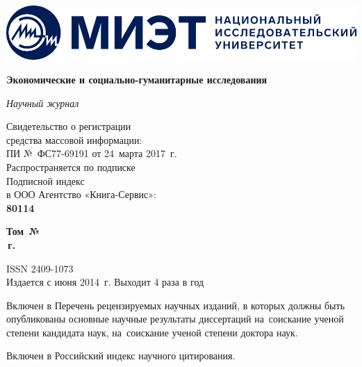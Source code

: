 
\pagestyle{empty}
\begin{center}
  \includegraphics[width=\textwidth]{logo}
\vspace*{5mm}
{\fontsize{16pt}{20pt}\selectfont\bfseries Экономические и социально-гуманитарные исследования \par}

{\itshape Научный журнал}
\end{center}

\noindent
\begin{minipage}{.5\textwidth}
  \small
Свидетельство о регистрации\\
средства массовой информации:\\
ПИ № ФС77-69191 от 24 марта 2017 г.\\
Распространяется по подписке\\
Подписной индекс\\
в ООО Агентство «Книга-Сервис»:\\
\textbf{80114}
\end{minipage}%
\begin{minipage}{.5\textwidth}
\begin{flushright}
  {\fontsize{16pt}{20pt}\selectfont\bfseries Том\,\esgiVol{} №\,\esgiNum{}\\
  \esgiYear\,г.\par}

  \vspace{5mm}
  \small
  ISSN 2409-1073\\
  Издается с июня 2014 г. Выходит 4 раза в год
\end{flushright}
\end{minipage}

\begin{flushleft}
  \small
  Включен в Перечень рецензируемых научных изданий, в которых должны быть опубликованы
основные научные результаты диссертаций на соискание ученой степени кандидата наук,
на соискание ученой степени доктора наук.

\vspace{5mm}
Включен в Российский индекс научного цитирования.
\end{flushleft}

